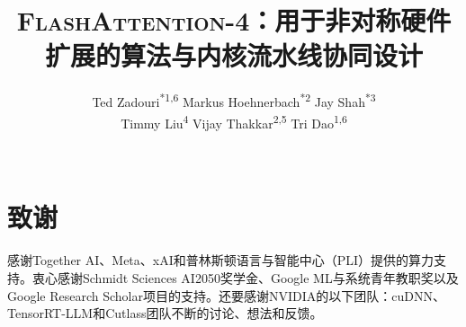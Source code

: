 \documentclass[11pt]{article}
\newcommand{\faf}{\textsc{FlashAttention-4}\xspace}
\begin{document}
\title{\faf：用于非对称硬件扩展的算法与内核流水线协同设计}

\author{%
  \begin{tabular}{c}
    Ted Zadouri\textsuperscript{*1,6} \quad
    Markus Hoehnerbach\textsuperscript{*2} \quad
    Jay Shah\textsuperscript{*3} \\
    Timmy Liu\textsuperscript{4} \quad
    Vijay Thakkar\textsuperscript{2,5} \quad
    Tri Dao\textsuperscript{1,6}
  \end{tabular}
  \\
}
\date{}

\begingroup
\renewcommand{\thefootnote}{\fnsymbol{footnote}}
\maketitle
{}
\endgroup

\begin{abstract}

\end{abstract}








\section*{致谢}
感谢Together AI、Meta、xAI和普林斯顿语言与智能中心（PLI）提供的算力支持。衷心感谢Schmidt Sciences AI2050奖学金、Google ML与系统青年教职奖以及Google Research Scholar项目的支持。还要感谢NVIDIA的以下团队：cuDNN、TensorRT-LLM和Cutlass团队不断的讨论、想法和反馈。




\appendix

\end{document}
